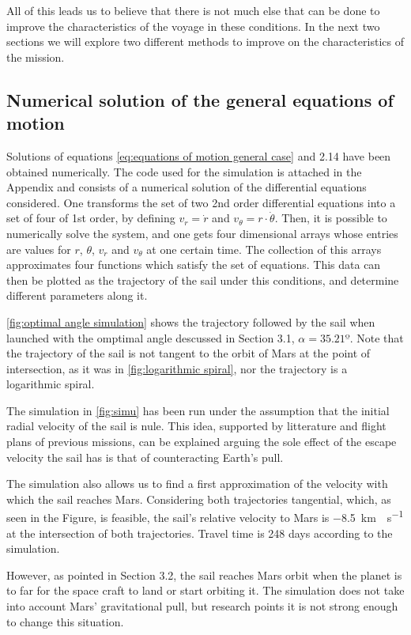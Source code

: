 \documentclass[twocolumn,12pt,a4paper]{article}
\numberwithin{equation}{section}
\begin{document}
All of this leads us to believe that there is not much else that can be done to improve the characteristics of the voyage in these conditions. In the next two sections we will explore two different methods to improve on the characteristics of the mission.

\subsection{Numerical solution of the general equations of motion}
Solutions of equations \ref{eq:equations of motion general case} and 2.14 have been obtained numerically. The code used for the simulation is attached in the Appendix and consists of a numerical solution of the differential equations considered. One transforms the set of two 2nd order differential equations into a set of four of 1st order, by defining $v_r=\dot{r}$ and $v_\theta=r\cdot\dot{\theta}$. Then, it is possible to numerically solve the system, and one gets four dimensional arrays whose entries are values for $r$, $\theta$, $v_r$ and $v_\theta$ at one certain time. The collection of this arrays approximates four functions which satisfy the set of equations. This data can then be plotted as the trajectory of the sail under this conditions, and determine different parameters along it.

 \autoref{fig:optimal angle simulation} shows the trajectory followed by the sail when launched with the omptimal angle descussed in Section 3.1, $\alpha=35.21º$. Note that the trajectory of the sail is not tangent to the orbit of Mars at the point of intersection, as it was in \autoref{fig:logarithmic spiral}, nor the trajectory is a logarithmic spiral.

The simulation in  \autoref{fig:simu} has been run under the assumption that the initial radial velocity of the sail is nule. This idea, supported by litterature and flight plans of previous missions, can be explained arguing the sole effect of the escape velocity the sail has is that of counteracting Earth's pull.

The simulation also allows us to find a first approximation of the velocity with which the sail reaches Mars. Considering both trajectories tangential, which, as seen in the Figure, is feasible, the sail's relative velocity to Mars is \SI{-8,5}{km\cdot s^{-1}} at the intersection of both trajectories. Travel time is 248 days according to the simulation.

However, as pointed in Section 3.2, the sail reaches Mars orbit when the planet is to far for the space craft to land or start orbiting it. The simulation does not take into account Mars' gravitational pull, but research points it is not strong enough to change this situation.
\end{document}
